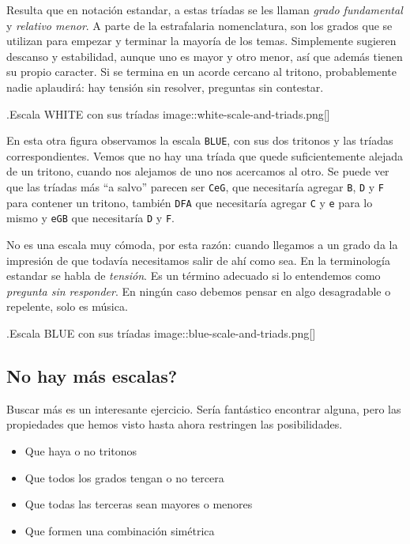 \documentclass[]{article}
\providecommand{\tightlist}{%
  \setlength{
\itemsep}{0pt}\setlength{\parskip}{0pt}}
\begin{document}
Resulta que en notación estandar, a estas tríadas se les llaman \emph{grado fundamental} y \emph{relativo menor}. A parte de la estrafalaria nomenclatura, son los grados que se utilizan para empezar y terminar la mayoría de los temas. Simplemente sugieren descanso y estabilidad, aunque uno es mayor y otro menor, así que además tienen su propio caracter. Si se termina en un acorde cercano al tritono, probablemente nadie aplaudirá: hay tensión sin resolver, preguntas sin contestar.

.Escala WHITE con sus tríadas image::white-scale-and-triads.png{[}{]}

En esta otra figura observamos la escala \texttt{BLUE}, con sus dos tritonos y las tríadas correspondientes. Vemos que no hay una tríada que quede suficientemente alejada de un tritono, cuando nos alejamos de uno nos acercamos al otro. Se puede ver que las tríadas más ``a salvo'' parecen ser \texttt{CeG}, que necesitaría agregar \texttt{B}, \texttt{D} y \texttt{F} para contener un tritono, también \texttt{DFA} que necesitaría agregar \texttt{C} y \texttt{e} para lo mismo y \texttt{eGB} que necesitaría \texttt{D} y \texttt{F}.

No es una escala muy cómoda, por esta razón: cuando llegamos a un grado da la impresión de que todavía necesitamos salir de ahí como sea. En la terminología estandar se habla de \emph{tensión}. Es un término adecuado si lo entendemos como \emph{pregunta sin responder}. En ningún caso debemos pensar en algo desagradable o repelente, solo es música.

.Escala BLUE con sus tríadas image::blue-scale-and-triads.png{[}{]}

\subsection{No hay más escalas?}

Buscar más es un interesante ejercicio. Sería fantástico encontrar alguna, pero las propiedades que hemos visto hasta ahora restringen las posibilidades.

\begin{itemize}   \tightlist   
  \item Que haya o no tritonos   
  \item Que todos los grados tengan o no tercera   
  \item Que todas las terceras sean mayores o menores   
  \item Que formen una combinación simétrica 
\end{itemize}
\end{document}
